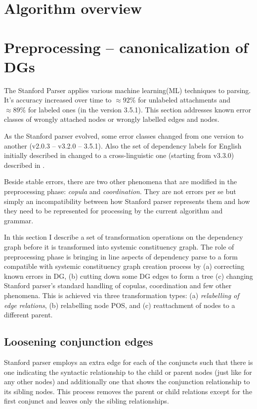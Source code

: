 \section{Algorithm overview}


\section{Preprocessing -- canonicalization of DGs}
\label{sec:preprocessing1}
The Stanford Parser applies various machine learning(ML) techniques to parsing. It's accuracy increased over time to $\approx92\%$ for unlabeled attachments and $\approx89\%$ for labeled ones (in the version 3.5.1). This section addresses known error classes of wrongly attached nodes or wrongly labelled edges and nodes. 

As the Stanford parser evolved, some error classes changed from one version to another (v2.0.3 -- v3.2.0 -- 3.5.1). Also the set of dependency labels for English initially described in \citep{Marneffe2008, Marneffe2008a} changed to a cross-linguistic one (starting from v3.3.0) described in \citep{Marneffe2014}. 

Beside stable errors, there are two other phenomena that are modified in the preprocessing phase: \textit{copula} and \textit{coordination}. They are not errors per se but simply an incompatibility between how Stanford parser represents them and how they need to be represented for processing by the current algorithm and grammar.

In this section I describe a set of transformation operations on the dependency graph before it is transformed into systemic constituency graph. The role of preprocessing phase is bringing in line aspects of dependency parse to a form compatible with systemic constituency graph creation process by (a) correcting known errors in DG, (b) cutting down some DG edges to form a tree (c) changing Stanford parser's standard handling of copulas, coordination and few other phenomena. This is achieved via three transformation types: (a) \textit{relabelling of edge relations}, (b) relabelling node POS, and (c) reattachment of nodes to a different parent. 

\subsection{Loosening conjunction edges}
Stanford parser employs an extra edge for each of the conjuncts such that there is one indicating the syntactic relationship to the child or parent nodes (just like for any other nodes) and additionally one that shows the conjunction relationship to its sibling nodes. This process removes the parent or child relations except for the first conjunct and leaves only the sibling relationships. 

